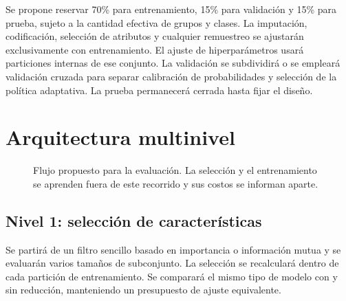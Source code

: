 Se propone reservar 70\% para entrenamiento, 15\% para validación y 15\% para prueba, sujeto a la cantidad efectiva de grupos y clases. La imputación, codificación, selección de atributos y cualquier remuestreo se ajustarán exclusivamente con entrenamiento. El ajuste de hiperparámetros usará particiones internas de ese conjunto. La validación se subdividirá o se empleará validación cruzada para separar calibración de probabilidades y selección de la política adaptativa. La prueba permanecerá cerrada hasta fijar el diseño.

\section{Arquitectura multinivel}
\begin{figure}[htbp]
\centering
{}
\caption{Flujo propuesto para la evaluación. La selección y el entrenamiento se aprenden fuera de este recorrido y sus costos se informan aparte.}
\label{fig:arquitectura}
\end{figure}

\subsection{Nivel 1: selección de características}
Se partirá de un filtro sencillo basado en importancia o información mutua y se evaluarán varios tamaños de subconjunto. La selección se recalculará dentro de cada partición de entrenamiento. Se comparará el mismo tipo de modelo con y sin reducción, manteniendo un presupuesto de ajuste equivalente.

